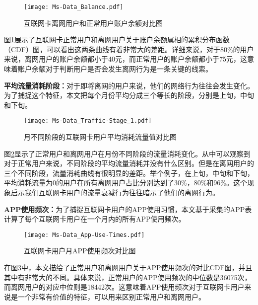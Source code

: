 \begin{figure}[hbt]
	\centering
	\texttt{[image: Ms-Data\_Balance.pdf]}
	\caption{互联网卡离网用户和正常用户账户余额对比图}
	\label{Fig:Balance}
\end{figure}

图\ref{Fig:Balance}展示了互联网卡正常用户和离网用户关于账户余额属相的累积分布函数（CDF）图，可以看出这两条曲线有着非常大的差距。详细来说，对于80\%的用户来说，离网用户的账户余额都小于40元，而正常用户的账户余额都小于75元，这意味着账户余额对于判断用户是否会发生离网行为是一条关键的线索。

\par

\textbf{平均流量消耗阶段：}对于即将离网的用户来说，他们的网络行为往往会发生变化。为了捕捉这个特征，本文把每个月份平均分成三个等长的阶段，分别是上旬，中旬和下旬。\par
\begin{figure}[!hbt]
	\centering
	\texttt{[image: Ms-Data\_Traffic-Stage\_1.pdf]}
	\caption{月不同阶段的互联网卡用户平均消耗流量值对比图}
	\label{Fig:Traffic-Stage}
\end{figure}
图\ref{Fig:Traffic-Stage}显示了正常用户和离网用户在月份不同阶段的流量消耗变化。从中可以观察到对于正常用户来说，不同阶段的平均流量消耗并没有什么区别。但是在离网用户的三个不同阶段，流量消耗曲线有很明显的差距。举个例子，在上旬，中旬和下旬，平均消耗流量为0的用户在所有离网用户占比分别达到了30\%，80\%和96\%。这个现象启示我们互联网卡用户的流量衰减行为往往暗示了他们的离网行为。
\par

\textbf{APP使用频次：}为了捕捉互联网卡用户的APP使用习惯，本文基于采集的APP表计算了每个互联网卡用户在一个月内的所有APP使用频次。\par

\begin{figure}[hbt]
	\centering
	\texttt{[image: Ms-Data\_App-Use-Times.pdf]}
	\caption{互联网卡用户月APP使用频次对比图}
	\label{Fig:App-Use-Times}
\end{figure}
在图\ref{Fig:App-Use-Times}中，本文描绘了正常用户和离网用户关于APP使用频次的对比CDF图，并且其中有非常大的不同。具体来说，正常用户的APP使用频次的中位数是36075次，而离网用户的对应中位则是18442次。这意味着APP使用频次对于互联网卡用户来说是一个非常有价值的特征，可以用来区别正常用户和离网用户。
\par


